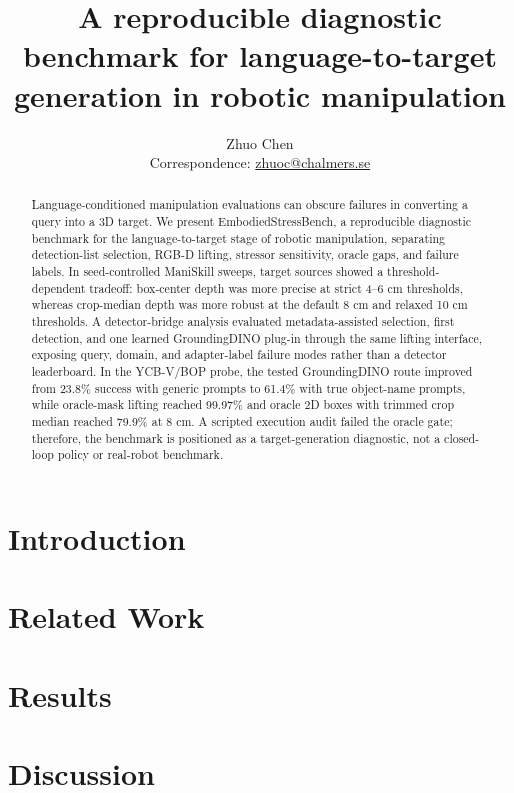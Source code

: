 \documentclass[10pt]{article}
\title{A reproducible diagnostic benchmark for language-to-target generation in robotic manipulation}
\author{Zhuo Chen\\Correspondence: \href{mailto:zhuoc@chalmers.se}{zhuoc@chalmers.se}}
\date{}
\begin{document}
\maketitle

\begin{abstract}
Language-conditioned manipulation evaluations can obscure failures in converting a query into a 3D target. We present EmbodiedStressBench, a reproducible diagnostic benchmark for the language-to-target stage of robotic manipulation, separating detection-list selection, RGB-D lifting, stressor sensitivity, oracle gaps, and failure labels. In seed-controlled ManiSkill sweeps, target sources showed a threshold-dependent tradeoff: box-center depth was more precise at strict 4--6 cm thresholds, whereas crop-median depth was more robust at the default 8 cm and relaxed 10 cm thresholds. A detector-bridge analysis evaluated metadata-assisted selection, first detection, and one learned GroundingDINO plug-in through the same lifting interface, exposing query, domain, and adapter-label failure modes rather than a detector leaderboard. In the YCB-V/BOP probe, the tested GroundingDINO route improved from 23.8\% success with generic prompts to 61.4\% with true object-name prompts, while oracle-mask lifting reached 99.97\% and oracle 2D boxes with trimmed crop median reached 79.9\% at 8 cm. A scripted execution audit failed the oracle gate; therefore, the benchmark is positioned as a target-generation diagnostic, not a closed-loop policy or real-robot benchmark.
\end{abstract}

\section{Introduction}


\section{Related Work}


\section{Results}


\section{Discussion}

\end{document}
